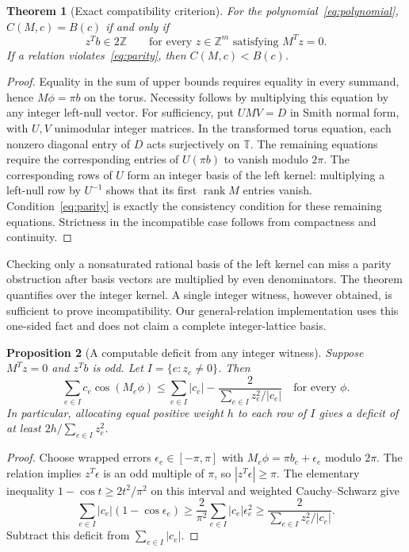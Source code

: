 \documentclass[11pt]{article}
\newtheorem{theorem}{Theorem}[section]
\newtheorem{proposition}[theorem]{Proposition}
\newcommand{\T}{\mathbb T}\newcommand{\Z}{\mathbb Z}\newcommand{\R}{\mathbb R}
\begin{document}
\begin{theorem}[Exact compatibility criterion]\label{thm:criterion}
For the polynomial~\eqref{eq:polynomial}, $C(M,c)=B(c)$ if and only if
\begin{equation}\label{eq:parity}
 z^Tb\in2\Z\qquad\text{for every }z\in\Z^m\text{ satisfying }M^Tz=0.
\end{equation}
If a relation violates~\eqref{eq:parity}, then $C(M,c)<B(c)$.
\end{theorem}
\begin{proof}
Equality in the sum of upper bounds requires equality in every summand, hence $M\phi=\pi b$ on the torus. Necessity follows by multiplying this equation by any integer left-null vector. For sufficiency, put $UMV=D$ in Smith normal form, with $U,V$ unimodular integer matrices. In the transformed torus equation, each nonzero diagonal entry of $D$ acts surjectively on $\T$. The remaining equations require the corresponding entries of $U(\pi b)$ to vanish modulo $2\pi$. The corresponding rows of $U$ form an integer basis of the left kernel: multiplying a left-null row by $U^{-1}$ shows that its first $\operatorname{rank}M$ entries vanish. Condition~\eqref{eq:parity} is exactly the consistency condition for these remaining equations. Strictness in the incompatible case follows from compactness and continuity.
\end{proof}

Checking only a nonsaturated rational basis of the left kernel can miss a parity obstruction after basis vectors are multiplied by even denominators. The theorem quantifies over the integer kernel. A single integer witness, however obtained, is sufficient to prove incompatibility. Our general-relation implementation uses this one-sided fact and does not claim a complete integer-lattice basis.

\begin{proposition}[A computable deficit from any integer witness]\label{prop:general}
Suppose $M^Tz=0$ and $z^Tb$ is odd. Let $I=\{e:z_e\ne0\}$. Then
\begin{equation}\label{eq:weighteddeficit}
 \sum_{e\in I}c_e\cos(M_e\phi)
 \le \sum_{e\in I}|c_e|-\frac{2}{\sum_{e\in I}z_e^2/|c_e|}
 \quad\text{for every }\phi.
\end{equation}
In particular, allocating equal positive weight $h$ to each row of $I$ gives a deficit of at least $2h/\sum_{e\in I}z_e^2$.
\end{proposition}
\begin{proof}
Choose wrapped errors $\epsilon_e\in[-\pi,\pi]$ with $M_e\phi=\pi b_e+\epsilon_e$ modulo $2\pi$. The relation implies $z^T\epsilon$ is an odd multiple of $\pi$, so $|z^T\epsilon|\ge\pi$. The elementary inequality $1-\cos t\ge 2t^2/\pi^2$ on this interval and weighted Cauchy--Schwarz give
\[
 \sum_{e\in I}|c_e|(1-\cos\epsilon_e)
 \ge\frac{2}{\pi^2}\sum_{e\in I}|c_e|\epsilon_e^2
 \ge \frac{2}{\sum_{e\in I}z_e^2/|c_e|}.
\]
Subtract this deficit from $\sum_{e\in I}|c_e|$.
\end{proof}
\end{document}
